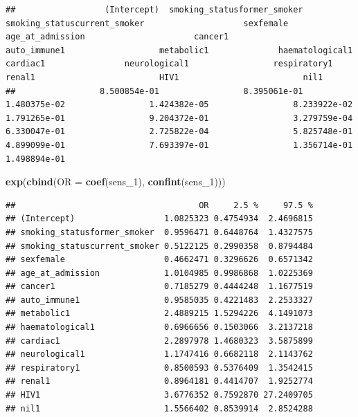 \documentclass[
]{article}
\newenvironment{Shaded}{\begin{snugshade}}{\end{snugshade}}
\newcommand{\DataTypeTok}[1]{\textcolor[rgb]{0.13,0.29,0.53}{#1}}
\newcommand{\DecValTok}[1]{\textcolor[rgb]{0.00,0.00,0.81}{#1}}
\newcommand{\KeywordTok}[1]{\textcolor[rgb]{0.13,0.29,0.53}{\textbf{#1}}}
\newcommand{\NormalTok}[1]{#1}
\begin{document}
\begin{verbatim}
##                  (Intercept)  smoking_statusformer_smoker smoking_statuscurrent_smoker                    sexfemale             age_at_admission                      cancer1                 auto_immune1                   metabolic1              haematological1                     cardiac1                neurological1                 respiratory1                       renal1                         HIV1                         nil1 
##                 8.500854e-01                 8.395061e-01                 1.480375e-02                 1.424382e-05                 8.233922e-02                 1.791265e-01                 9.204372e-01                 3.279759e-04                 6.330047e-01                 2.725822e-04                 5.825748e-01                 4.899099e-01                 7.693397e-01                 1.356714e-01                 1.498894e-01
\end{verbatim}

\begin{Shaded}
\begin{Highlighting}[]
\KeywordTok{exp}\NormalTok{(}\KeywordTok{cbind}\NormalTok{(}\DataTypeTok{OR =} \KeywordTok{coef}\NormalTok{(sens_}\DecValTok{1}\NormalTok{), }\KeywordTok{confint}\NormalTok{(sens_}\DecValTok{1}\NormalTok{)))}
\end{Highlighting}
\end{Shaded}

\begin{verbatim}
##                                     OR     2.5 %     97.5 %
## (Intercept)                  1.0825323 0.4754934  2.4696815
## smoking_statusformer_smoker  0.9596471 0.6448764  1.4327575
## smoking_statuscurrent_smoker 0.5122125 0.2990358  0.8794484
## sexfemale                    0.4662471 0.3296626  0.6571342
## age_at_admission             1.0104985 0.9986868  1.0225369
## cancer1                      0.7185279 0.4444248  1.1677519
## auto_immune1                 0.9585035 0.4221483  2.2533327
## metabolic1                   2.4889215 1.5294226  4.1491073
## haematological1              0.6966656 0.1503066  3.2137218
## cardiac1                     2.2897978 1.4680323  3.5875899
## neurological1                1.1747416 0.6682118  2.1143762
## respiratory1                 0.8500593 0.5376409  1.3542415
## renal1                       0.8964181 0.4414707  1.9252774
## HIV1                         3.6776352 0.7592870 27.2409705
## nil1                         1.5566402 0.8539914  2.8524288
\end{verbatim}
\end{document}
